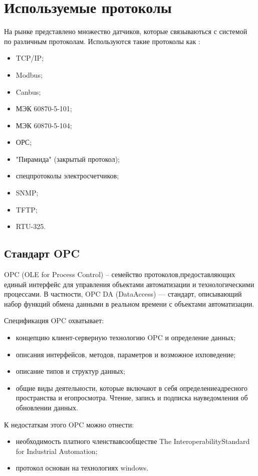 \section{Используемые протоколы}

На рынке представлено множество датчиков, которые связываються с системой по различным протоколам. Используются такие протоколы как \cite{askue_ops}:
\begin{itemize}
\item TCP/IP;
\item Modbus;
\item Canbus;
\item МЭК 60870-5-101;
\item МЭК 60870-5-104;
\item ОРС;
\item "Пирамида" (закрытый протокол);
\item спецпротоколы электросчетчиков;
\item SNMP;
\item TFTP;
\item RTU-325.
\end{itemize}

\subsection{Стандарт OPC}

OPC (OLE for Process Control) – семейство протоколов,предоставляющих единый интерфейс для управления объектами автоматизации и технологическими процессами. В частности, OPC DA (DataAccess) — стандарт, описывающий набор функций обмена данными в реальном времени с объектами автоматизации. 

Спецификация OPC охватывает:
\begin{itemize}
 \item концепцию клиент-серверную технологию OPC и определение данных;
 \item описания интерфейсов, методов, параметров и возможное ихповедение;
 \item описание типов и структур данных;
 \item общие виды деятельности, которые включают в себя определениеадресного пространства и егопросмотра. Чтение, запись и подписка науведомления об обновлении данных.
\end{itemize}

К недостаткам этого OPC можно отнести:
\begin{itemize}
 \item необходимость платного членствавсообществе The InteroperabilityStandard for Industrial Automation;
 \item протокол основан на технологиях windows.
\end{itemize}

